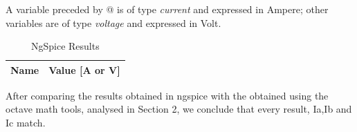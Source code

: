 A variable preceded by @ is of type {\em current} and expressed in Ampere; other variables are of type {\it voltage} and expressed in
    Volt.
\begin{table}[ht]
  \centering
  \begin{tabular}{|l|r|}
    \hline    
    {\bf Name} & {\bf Value [A or V]} \\ \hline
    
  \end{tabular}
  \caption{NgSpice Results}
  \label{tab:op}
\end{table}

After comparing the results obtained in ngspice with the obtained using the octave math tools, analysed in Section 2, we conclude that every result, Ia,Ib and Ic match.



